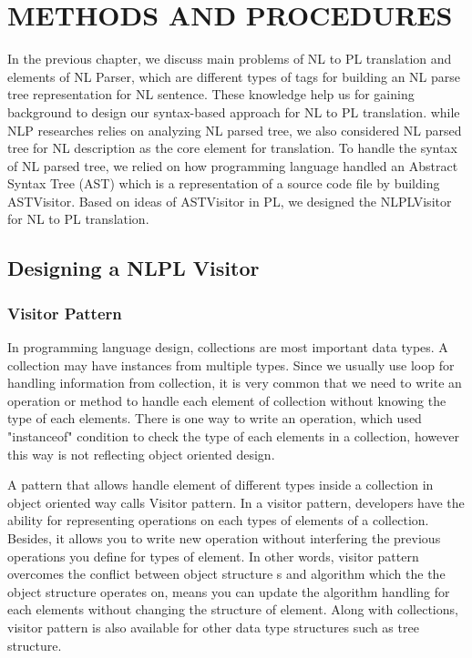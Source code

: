 \chapter{METHODS AND PROCEDURES}
In the previous chapter, we discuss main problems of NL to PL translation and elements of NL Parser, which are different types of tags for building an NL parse tree representation for NL sentence. These knowledge help us for gaining background to design our syntax-based approach for NL to PL translation. while NLP researches relies on analyzing NL parsed tree, we also considered NL parsed tree for NL description as the core element for translation. To handle the syntax of NL parsed tree, we relied on how programming language handled an Abstract Syntax Tree (AST) which is a representation of a source code file by building ASTVisitor. Based on ideas of ASTVisitor in PL, we designed the NLPLVisitor for NL to PL translation.  
\section{Designing a NLPL Visitor}
\subsection{Visitor Pattern}
In programming language design, collections are most important data types. A collection may have instances from multiple types. Since we usually use loop for handling information from collection, it is very common that we need to write an operation or method to handle each element of collection without knowing the type of each elements. There is one way to write an operation, which used "instanceof" condition to check the type of each elements in a collection, however this way is not reflecting object oriented design. 

A pattern that allows handle element of different types inside a collection in object oriented way calls Visitor pattern. In a visitor pattern, developers have the ability for representing operations on each types of elements of a collection. Besides, it allows you to write new operation without interfering the previous operations you define for types of element. In other words, visitor pattern overcomes the conflict between object structure s and algorithm  which the the object structure operates on, means you can update the algorithm handling for each elements without changing the structure of element. Along with collections, visitor pattern is also available for other data type structures such as tree structure.

